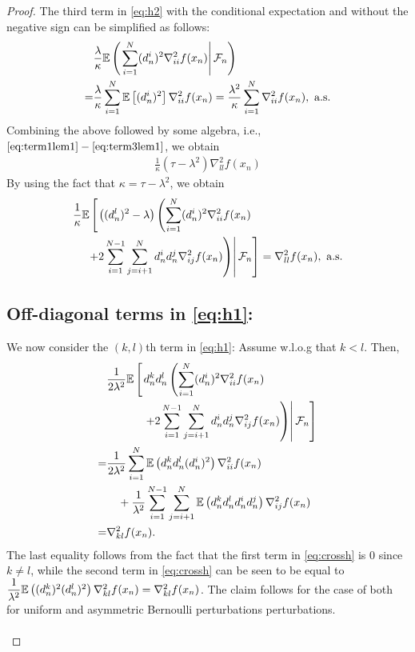 \begin{proof}
The third term in \eqref{eq:h2} with the conditional expectation and without the negative sign can be simplified as follows: 
\begin{align}\label{eq:term3lem1}
&\dfrac{ \lambda}{\kappa} \E\left(\left. \sum\limits_{i=1}^N (d_n^i)^2 \nabla^2_{ii} f(x_n) \right| \F_n\right)\nonumber\\
= &\dfrac{ \lambda}{\kappa} \sum\limits_{i=1}^N \E \left[(d_n^i)^2\right] \nabla^2_{ii} f(x_n) 
=  \dfrac{\lambda^2}{\kappa} \sum\limits_{i=1}^N \nabla^2_{ii} f(x_n), \text{ a.s.}
\end{align} 
Combining the above followed by some algebra, i.e., $\eqref{eq:term1lem1}-\eqref{eq:term3lem1}$, we obtain
\begin{align*}
\frac{1}{\kappa} (\tau - \lambda^2) \nabla^2_{ll} f(x_n)
\end{align*} 
By using the fact that $\kappa = \tau - \lambda^2$, we obtain
\begin{align*}
&\dfrac{1}{\kappa}  \mathbb{E}\left[\left. \left((d_n^l)^2-\lambda\right) \left(\sum\limits_{i=1}^N (d_n^i)^2 \nabla^2_{ii} f(x_n) \right.\right.\right.\\
&\hspace{1em}\left.\left.\left. + 2\sum\limits_{i=1}^{N-1}\sum\limits_{j=i+1}^N d_n^i d_n^j \nabla^2_{ij} f(x_n)\right)\right| \mathcal{F}_n\right] = \nabla^2_{ll} f(x_n), \text{ a.s.}
\end{align*}

\subsection*{Off-diagonal terms in \eqref{eq:h1}:}

We now consider the $(k,l)$th term in \eqref{eq:h1}: Assume w.l.o.g that $k<l$. Then,
\begin{align}
& \dfrac{1}{2 \lambda^2} \E\left[\left.d_n^k d_n^l   \left(\sum\limits_{i=1}^N (d_n^i)^2 \nabla^2_{ii} f(x_n) \right.\right.\right. \nonumber\\
&\hspace{3em}\left.\left.\left.+ 2\sum\limits_{i=1}^{N-1}\sum\limits_{j=i+1}^N d_n^i d_n^j \nabla^2_{ij} f(x_n)\right)\right| \F_n \right]\nonumber\\
=& \dfrac{1}{2 \lambda^2} \sum\limits_{i=1}^N \E \left(d_n^k d_n^l (d_n^i)^2 \right)\nabla^2_{ii} f(x_n) \nonumber\\
& \quad+ \dfrac{1}{\lambda^2}\sum\limits_{i=1}^{N-1}\sum\limits_{j=i+1}^N \E\left(d_n^k d_n^l d_n^i d_n^j\right) \nabla^2_{ij} f(x_n) \label{eq:crossh}\\
= & \nabla^2_{kl} f(x_n).\nonumber
\end{align}
The last equality follows from the fact that the first term in \eqref{eq:crossh} is $0$ since $k\ne l$, while the second term in \eqref{eq:crossh} can be seen to be equal to $\dfrac{1}{\lambda^2} \mathbb{E}\left((d_n^k)^2 (d_n^l)^2\right) \nabla^2_{kl} f(x_n) = \nabla^2_{kl} f(x_n)$.
The claim follows for the case of both for uniform and  asymmetric Bernoulli perturbations perturbations.\ \\\ \\

\end{proof}

